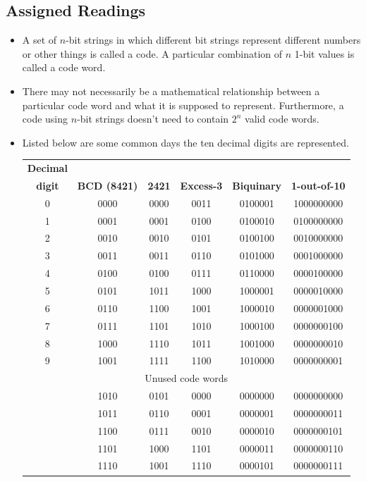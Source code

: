 \documentclass[10pt,a4paper]{article}
\begin{document}
\subsection{Assigned Readings}
\begin{itemize}
\item A set of $n$-bit strings in which different bit strings represent different numbers or other things is called a code. A particular combination of $n$ 1-bit values is called a code word. 
\item There may not necessarily be a mathematical relationship between a particular code word and what it is supposed to represent. Furthermore, a code using $n$-bit strings doesn't need to contain $2^n$ valid code words. 
\item Listed below are some common days the ten decimal digits are represented.\\
\begin{tabular}{|cccccc|}
\hline 
\textbf{Decimal} & & & & &\\
\textbf{digit} & \textbf{BCD (8421)} & \textbf{2421} & \textbf{Excess-3} & \textbf{Biquinary} & \textbf{1-out-of-10} \\
\hline 
0 & 0000 & 0000 & 0011 & 0100001 & 1000000000 \\ 
1 & 0001 & 0001 & 0100 & 0100010 & 0100000000 \\ 
2 & 0010 & 0010 & 0101 & 0100100 & 0010000000 \\ 
3 & 0011 & 0011 & 0110 & 0101000 & 0001000000 \\ 
4 & 0100 & 0100 & 0111 & 0110000 & 0000100000 \\  
5 & 0101 & 1011 & 1000 & 1000001 & 0000010000 \\ 
6 & 0110 & 1100 & 1001 & 1000010 & 0000001000 \\ 
7 & 0111 & 1101 & 1010 & 1000100 & 0000000100 \\ 
8 & 1000 & 1110 & 1011 & 1001000 & 0000000010 \\ 
9 & 1001 & 1111 & 1100 & 1010000 & 0000000001 \\ 
\hline 
\multicolumn{6}{|c|}{Unused code words} \\ 
\hline 
 & 1010 & 0101 & 0000 & 0000000 & 0000000000 \\ 
 & 1011 & 0110 & 0001 & 0000001 & 0000000011 \\  
 & 1100 & 0111 & 0010 & 0000010 & 0000000101 \\ 
 & 1101 & 1000 & 1101 & 0000011 & 0000000110 \\ 
 & 1110 & 1001 & 1110 & 0000101 & 0000000111 \\ 

\end{tabular}
\end{itemize}
\end{document}

